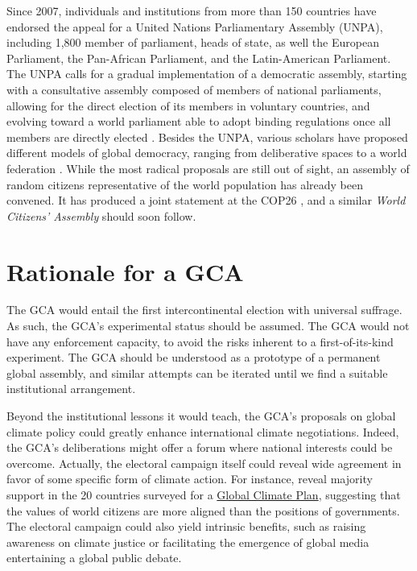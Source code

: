 \documentclass[12pt,english]{article}
\begin{document}
Since 2007, individuals and institutions from more than 150 countries have endorsed the appeal for a United Nations Parliamentary Assembly (UNPA), including 1,800 member of parliament, heads of state, as well the European Parliament, the Pan-African Parliament, and the Latin-American Parliament. The UNPA calls for a gradual implementation of a democratic assembly, starting with a consultative assembly composed of members of national parliaments, allowing for the direct election of its members in voluntary countries, and evolving toward a world parliament able to adopt binding regulations once all members are directly elected \citep{leinen_world_2018}. %
Besides the UNPA, various scholars have proposed different models of global democracy, ranging from deliberative spaces to a world federation \citep{archibugi_global_2011}. %
While the most radical proposals are still out of sight, an assembly of random citizens representative of the world population has already been convened. It has produced a joint statement at the COP26 \citep{global_assembly_report_2022}, and a similar \textit{World Citizens' Assembly} should soon follow. 

\section{Rationale for a GCA}

The GCA would entail the first intercontinental election with universal suffrage. As such, the GCA's experimental status should be assumed. The GCA would not have any enforcement capacity, to avoid the risks inherent to a first-of-its-kind experiment. 
The GCA should be understood as a prototype of a permanent global assembly, and similar attempts can be iterated until we find a suitable institutional arrangement. 

Beyond the institutional lessons it would teach, the GCA's proposals on global climate policy could greatly enhance international climate negotiations. Indeed, the GCA's deliberations might offer a forum where national interests could be overcome. Actually, the electoral campaign itself could reveal wide agreement in favor of some specific form of climate action. For instance, \citet{fabre_international_2023} reveal majority support in the 20 countries surveyed for a \href{https://github.com/bixiou/global_tax_attitudes/raw/main/paper/policy_brief_GCS.pdf}{Global Climate Plan}, suggesting that the values of world citizens are more aligned than the positions of governments. The electoral campaign could also yield intrinsic benefits, such as raising awareness on climate justice or facilitating the emergence of global media entertaining a global public debate. 
\end{document}

